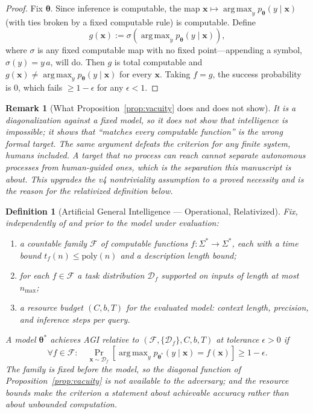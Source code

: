 \documentclass[11pt,a4paper]{article}
\newtheorem{definition}[theorem]{Definition}
\newtheorem{remark}[theorem]{Remark}
\DeclareMathOperator*{\argmax}{arg\,max}
\begin{document}
\begin{proof}
Fix $\bm{\theta}$. Since inference is computable, the map $\bm{x} \mapsto \argmax_{y} p_{\bm{\theta}}(y \mid \bm{x})$ (with ties broken by a fixed computable rule) is computable. Define
\begin{equation}
g(\bm{x}) := \sigma\!\left(\argmax_{y} p_{\bm{\theta}}(y \mid \bm{x})\right),
\end{equation}
where $\sigma$ is any fixed computable map with no fixed point---appending a symbol, $\sigma(y) = y\,a$, will do. Then $g$ is total computable and $g(\bm{x}) \neq \argmax_y p_{\bm{\theta}}(y \mid \bm{x})$ for every $\bm{x}$. Taking $f = g$, the success probability is $0$, which fails $\geq 1 - \epsilon$ for any $\epsilon < 1$.
\end{proof}

\begin{remark}[What Proposition~\ref{prop:vacuity} does and does not show]
It is a diagonalization against a \emph{fixed} model, so it does not show that intelligence is impossible; it shows that ``matches every computable function'' is the wrong formal target. The same argument defeats the criterion for any finite system, humans included. A target that no process can reach cannot separate autonomous processes from human-guided ones, which is the separation this manuscript is about. This upgrades the v4 nontriviality \emph{assumption} to a proved necessity and is the reason for the relativized definition below.
\end{remark}

\begin{definition}[Artificial General Intelligence --- Operational, Relativized]
\label{def:agi}
Fix, \emph{independently of and prior to} the model under evaluation:
\begin{enumerate}
    \item a countable family $\mathcal{F}$ of computable functions $f : \Sigma^* \to \Sigma^*$, each with a time bound $t_f(n) \leq \mathrm{poly}(n)$ and a description length bound;
    \item for each $f \in \mathcal{F}$ a task distribution $\mathcal{D}_f$ supported on inputs of length at most $n_{\max}$;
    \item a resource budget $(C, b, T)$ for the evaluated model: context length, precision, and inference steps per query.
\end{enumerate}
A model $\bm{\theta}^*$ achieves \emph{AGI relative to $(\mathcal{F}, \{\mathcal{D}_f\}, C, b, T)$} at tolerance $\epsilon > 0$ if
\begin{equation}
\forall f \in \mathcal{F}: \quad
\Pr_{\bm{x} \sim \mathcal{D}_f}\!\left[\argmax_{y} p_{\bm{\theta}^*}(y \mid \bm{x}) = f(\bm{x})\right] \geq 1 - \epsilon .
\end{equation}
The family is fixed before the model, so the diagonal function of Proposition~\ref{prop:vacuity} is not available to the adversary; and the resource bounds make the criterion a statement about achievable accuracy rather than about unbounded computation.
\end{definition}
\end{document}

